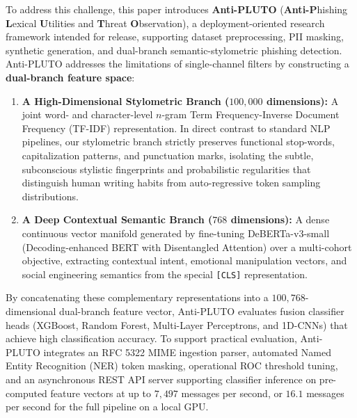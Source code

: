 \documentclass[journal]{IEEEtran}
\begin{document}
To address this challenge, this paper introduces \textbf{Anti-PLUTO} (\textbf{Anti-P}hishing \textbf{L}exical \textbf{U}tilities and \textbf{T}hreat \textbf{O}bservation), a deployment-oriented research framework intended for release, supporting dataset preprocessing, PII masking, synthetic generation, and dual-branch semantic-stylometric phishing detection. Anti-PLUTO addresses the limitations of single-channel filters by constructing a \textbf{dual-branch feature space}:
\begin{enumerate}
    \item \textbf{A High-Dimensional Stylometric Branch ($100,000$ dimensions):} A joint word- and character-level $n$-gram Term Frequency-Inverse Document Frequency (TF-IDF) representation. In direct contrast to standard NLP pipelines, our stylometric branch strictly preserves functional stop-words, capitalization patterns, and punctuation marks, isolating the subtle, subconscious stylistic fingerprints and probabilistic regularities that distinguish human writing habits from auto-regressive token sampling distributions.
    \item \textbf{A Deep Contextual Semantic Branch ($768$ dimensions):} A dense continuous vector manifold generated by fine-tuning DeBERTa-v3-small (Decoding-enhanced BERT with Disentangled Attention) \cite{he2023debertav3} over a multi-cohort objective, extracting contextual intent, emotional manipulation vectors, and social engineering semantics from the special \texttt{[CLS]} representation.
\end{enumerate}

By concatenating these complementary representations into a $100,768$-dimensional dual-branch feature vector, Anti-PLUTO evaluates fusion classifier heads (XGBoost, Random Forest, Multi-Layer Perceptrons, and 1D-CNNs) that achieve high classification accuracy. To support practical evaluation, Anti-PLUTO integrates an RFC 5322 MIME ingestion parser, automated Named Entity Recognition (NER) token masking, operational ROC threshold tuning, and an asynchronous REST API server supporting classifier inference on pre-computed feature vectors at up to $7{,}497$ messages per second, or $16.1$ messages per second for the full pipeline on a local GPU.
\end{document}
